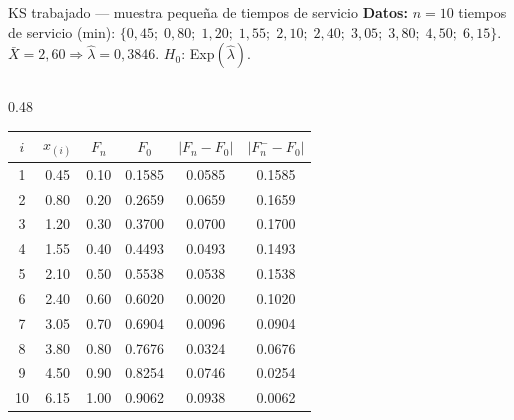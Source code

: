 \documentclass[aspectratio=1610, 10pt]{beamer}
\begin{document}
\begin{frame}{KS trabajado — muestra pequeña de tiempos de servicio}
  \footnotesize
  \textbf{Datos:} $n=10$ tiempos de servicio (min):
  $\{0{,}45;\;0{,}80;\;1{,}20;\;1{,}55;\;2{,}10;\;2{,}40;\;3{,}05;\;3{,}80;\;4{,}50;\;6{,}15\}$.\\
  $\bar X=2{,}60 \Rightarrow \hat\lambda=0{,}3846$. $H_0$: Exp$(\hat\lambda)$.

  \vspace{2pt}
  \begin{columns}[T]
    \begin{column}{0.48\textwidth}
      \begin{center}\scriptsize
        \renewcommand{\arraystretch}{1.15}
        \begin{tabular}{cccccc}
          \toprule
          $i$ & $x_{(i)}$ & $F_n$ & $F_0$ & $|F_n-F_0|$ & $|F_n^- - F_0|$ \\
          \midrule
          1  & 0.45 & 0.10 & 0.1585 & 0.0585 & 0.1585 \\
          2  & 0.80 & 0.20 & 0.2659 & 0.0659 & 0.1659 \\
          3  & 1.20 & 0.30 & 0.3700 & 0.0700 & 0.1700 \\
          4  & 1.55 & 0.40 & 0.4493 & 0.0493 & 0.1493 \\
          5  & 2.10 & 0.50 & 0.5538 & 0.0538 & 0.1538 \\
          6  & 2.40 & 0.60 & 0.6020 & 0.0020 & 0.1020 \\
          7  & 3.05 & 0.70 & 0.6904 & 0.0096 & 0.0904 \\
          8  & 3.80 & 0.80 & 0.7676 & 0.0324 & 0.0676 \\
          9  & 4.50 & 0.90 & 0.8254 & 0.0746 & 0.0254 \\
          10 & 6.15 & 1.00 & 0.9062 & 0.0938 & 0.0062 \\
          \bottomrule
        \end{tabular}
      \end{center}


\end{column}
\end{columns}
\end{frame}
\end{document}

